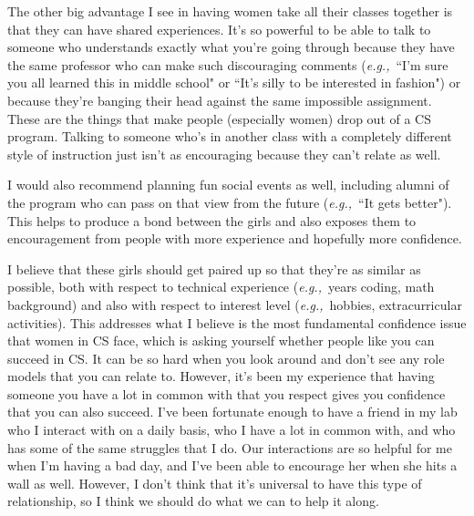 \documentclass{article}
\newcommand{\eg}{{\em e.g.,}~}
\begin{document}
The other big advantage I see in having women take all their classes together is that they can have shared experiences.
It's so powerful to be able to talk to someone who understands exactly what you're going through because they have the same professor who can make such discouraging comments (\eg ``I'm sure you all learned this in middle school" or ``It's silly to be interested in fashion") or because they're banging their head against the same impossible assignment.
These are the things that make people (especially women) drop out of a CS program.
Talking to someone who's in another class with a completely different style of instruction just isn't as encouraging because they can't relate as well.

I would also recommend planning fun social events as well, including alumni of the program who can pass on that view from the future (\eg ``It gets better").
This helps to produce a bond between the girls and also exposes them to encouragement from people with more experience and hopefully more confidence.

I believe that these girls should get paired up so that they're as similar as possible, both with respect to technical experience (\eg years coding, math background) and also with respect to interest level (\eg hobbies, extracurricular activities).
This addresses what I believe is the most fundamental confidence issue that women in CS face, which is asking yourself whether people like you can succeed in CS.
It can be so hard when you look around and don't see any role models that you can relate to.
However, it's been my experience that having someone you have a lot in common with that you respect gives you confidence that you can also succeed.
I've been fortunate enough to have a friend in my lab who I interact with on a daily basis, who I have a lot in common with, and who has some of the same struggles that I do.
Our interactions are so helpful for me when I'm having a bad day, and I've been able to encourage her when she hits a wall as well.
However, I don't think that it's universal to have this type of relationship, so I think we should do what we can to help it along.
\end{document}
